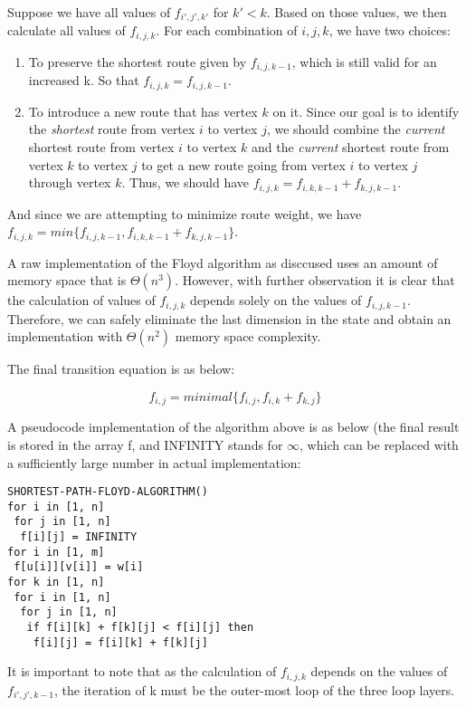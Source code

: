 \documentclass[a4paper,11pt,twocolumn]{article}
\begin{document}
Suppose we have all values of $f_{i',j',k'}$ for $k' < k$. Based on those values, we then calculate all values of $f_{i,j,k}$. For each combination of $i, j, k$, we have two choices:

\begin{enumerate}

\item{To preserve the shortest route given by $f_{i,j,k-1}$, which is still valid for an increased k. So that $f_{i,j,k}=f_{i,j,k-1}$. }
\item{To introduce a new route that has vertex $k$ on it. Since our goal is to identify the \emph{shortest} route from vertex $i$ to vertex $j$, we should combine the \emph{current} shortest route from vertex $i$ to vertex $k$ and the \emph{current} shortest route from vertex $k$ to vertex $j$ to get a new route going from vertex $i$ to vertex $j$ through vertex $k$. Thus, we should have $f_{i,j,k}=f_{i,k,k-1}+f_{k,j,k-1}$. }

\end{enumerate}

And since we are attempting to minimize route weight, we have $f_{i,j,k}=min\{f_{i,j,k-1},f_{i,k,k-1}+f_{k,j,k-1}\}$.

A raw implementation of the Floyd algorithm as disccused uses an amount of memory space that is $\Theta(n^3)$. However, with further observation it is clear that the calculation of values of $f_{i,j,k}$ depends solely on the values of $f_{i,j,k-1}$. Therefore, we can safely eliminate the last dimension in the state and obtain an implementation with $\Theta(n^2)$ memory space complexity.

The final transition equation is as below:

$$f_{i,j}=minimal\{f_{i,j},f_{i,k}+f_{k,j}\}$$

A pseudocode implementation of the algorithm above is as below (the final result is stored in the array f, and INFINITY stands for $\infty$, which can be replaced with a sufficiently large number in actual implementation:

\begin{verbatim}
SHORTEST-PATH-FLOYD-ALGORITHM()
for i in [1, n]
 for j in [1, n]
  f[i][j] = INFINITY
for i in [1, m]
 f[u[i]][v[i]] = w[i]
for k in [1, n]
 for i in [1, n]
  for j in [1, n]
   if f[i][k] + f[k][j] < f[i][j] then
    f[i][j] = f[i][k] + f[k][j]
\end{verbatim}

It is important to note that as the calculation of $f_{i,j,k}$ depends on the values of $f_{i',j',k-1}$, the iteration of k must be the outer-most loop of the three loop layers.
\end{document}
